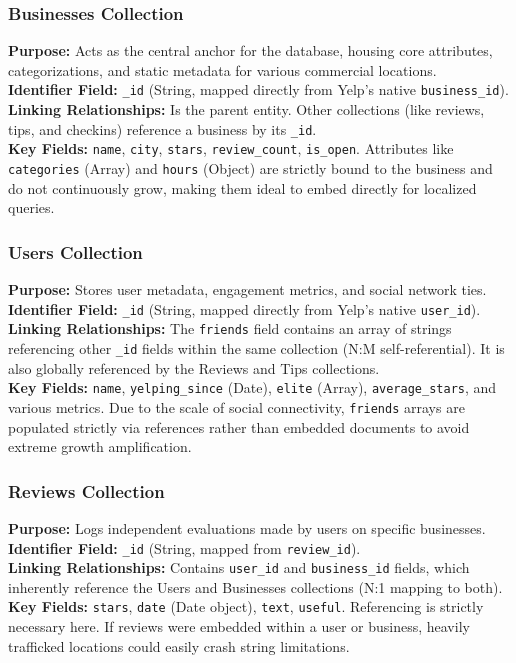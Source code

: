 \documentclass[11pt,a4paper]{article}
\begin{document}
\subsubsection*{Businesses Collection}
\textbf{Purpose:} Acts as the central anchor for the database, housing core attributes, categorizations, and static metadata for various commercial locations.\\
\textbf{Identifier Field:} \texttt{\_id} (String, mapped directly from Yelp's native \texttt{business\_id}).\\
\textbf{Linking Relationships:} Is the parent entity. Other collections (like reviews, tips, and checkins) reference a business by its \texttt{\_id}.\\
\textbf{Key Fields:} \texttt{name}, \texttt{city}, \texttt{stars}, \texttt{review\_count}, \texttt{is\_open}. Attributes like \texttt{categories} (Array) and \texttt{hours} (Object) are strictly bound to the business and do not continuously grow, making them ideal to embed directly for localized queries.

\subsubsection*{Users Collection}
\textbf{Purpose:} Stores user metadata, engagement metrics, and social network ties.\\
\textbf{Identifier Field:} \texttt{\_id} (String, mapped directly from Yelp's native \texttt{user\_id}).\\
\textbf{Linking Relationships:} The \texttt{friends} field contains an array of strings referencing other \texttt{\_id} fields within the same collection (N:M self-referential). It is also globally referenced by the Reviews and Tips collections.\\
\textbf{Key Fields:} \texttt{name}, \texttt{yelping\_since} (Date), \texttt{elite} (Array), \texttt{average\_stars}, and various metrics. Due to the scale of social connectivity, \texttt{friends} arrays are populated strictly via references rather than embedded documents to avoid extreme growth amplification.

\subsubsection*{Reviews Collection}
\textbf{Purpose:} Logs independent evaluations made by users on specific businesses.\\
\textbf{Identifier Field:} \texttt{\_id} (String, mapped from \texttt{review\_id}).\\
\textbf{Linking Relationships:} Contains \texttt{user\_id} and \texttt{business\_id} fields, which inherently reference the Users and Businesses collections (N:1 mapping to both).\\
\textbf{Key Fields:} \texttt{stars}, \texttt{date} (Date object), \texttt{text}, \texttt{useful}. Referencing is strictly necessary here. If reviews were embedded within a user or business, heavily trafficked locations could easily crash string limitations.
\end{document}
